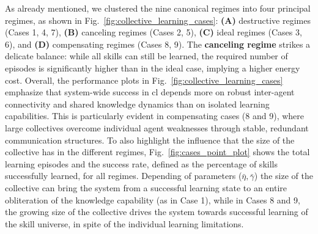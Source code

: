 \documentclass[12pt]{article}
\begin{document}
As already mentioned, we clustered the nine canonical regimes into four principal regimes, as shown in Fig.~\ref{fig:collective_learning_cases}: \textbf{(A)} destructive regimes (Cases 1, 4, 7), \textbf{(B)} canceling regimes (Cases 2, 5), \textbf{(C)} ideal regimes (Cases 3, 6), and \textbf{(D)} compensating regimes (Cases 8, 9). The \textbf{canceling regime} strikes a delicate balance: while all skills can still be learned, the required number of episodes is significantly higher than in the ideal case, implying a higher energy cost. Overall, the performance plots in Fig.~\ref{fig:collective_learning_cases} emphasize that system-wide success in \acl{cl} depends more on robust inter-agent connectivity and shared knowledge dynamics than on isolated learning capabilities. This is particularly evident in compensating cases (8 and 9), where large collectives overcome individual agent weaknesses through stable, redundant communication structures. To also highlight the influence that the size of the collective has in the different regimes, Fig.~\ref{fig:cases_point_plot} shows the total learning episodes and the success rate, defined as the percentage of skills successfully learned, for all regimes. Depending of parameters ($\bar{\eta},\bar{\gamma}$) the size of the collective can bring the system from a successful learning state to an entire obliteration of the knowledge capability (as in Case 1), while in Cases 8 and 9, the growing size of the collective drives the system towards successful learning of the skill universe, in spite of the individual learning limitations.


\end{document}

